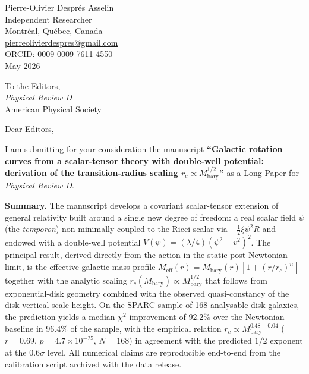 \documentclass[11pt]{article}
\begin{document}
\begin{flushright}
  Pierre-Olivier Despr\'{e}s Asselin \\
  Independent Researcher \\
  Montr\'{e}al, Qu\'{e}bec, Canada \\
  \href{mailto:pierreolivierdespres@gmail.com}{pierreolivierdespres@gmail.com} \\
  ORCID: 0009-0009-7611-4550 \\[6pt]
  May 2026
\end{flushright}

\bigskip

\noindent
To the Editors, \\
\textit{Physical Review D} \\
American Physical Society

\bigskip

Dear Editors,

I am submitting for your consideration the manuscript
\textbf{``Galactic rotation curves from a scalar-tensor theory with double-well
potential: derivation of the transition-radius scaling
$r_c\propto M_{\mathrm{bary}}^{1/2}$''} as a Long Paper for
\textit{Physical Review D}.

\bigskip

\textbf{Summary.}
The manuscript develops a covariant scalar-tensor extension of general
relativity built around a single new degree of freedom: a real scalar
field $\psi$ (the \emph{temporon}) non-minimally coupled to the Ricci
scalar via $-\tfrac{1}{2}\xi\psi^{2}R$ and endowed with a double-well
potential $V(\psi)=(\lambda/4)(\psi^{2}-v^{2})^{2}$. The principal
result, derived directly from the action in the static
post-Newtonian limit, is the effective galactic mass profile
$M_{\mathrm{eff}}(r)=M_{\mathrm{bary}}(r)[1+(r/r_c)^{n}]$ together
with the analytic scaling $r_c(M_{\mathrm{bary}})\propto
M_{\mathrm{bary}}^{1/2}$ that follows from exponential-disk geometry
combined with the observed quasi-constancy of the disk vertical scale
height. On the SPARC sample of 168 analysable disk galaxies, the
prediction yields a median $\chi^{2}$ improvement of $92.2\%$ over
the Newtonian baseline in $96.4\%$ of the sample, with the empirical
relation $r_c\propto M_{\mathrm{bary}}^{0.48\pm 0.04}$ ($r=0.69$,
$p=4.7\times 10^{-25}$, $N=168$) in agreement with the predicted
$1/2$ exponent at the $0.6\sigma$ level. All numerical claims are
reproducible end-to-end from the calibration script archived with
the data release.

\bigskip
\end{document}
